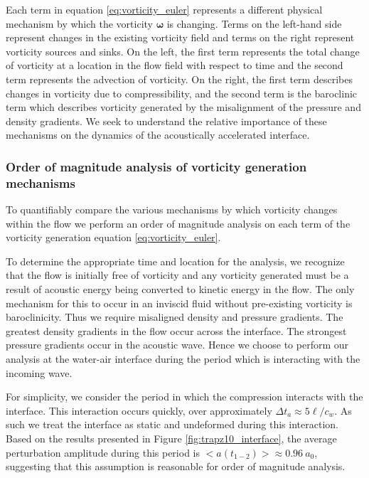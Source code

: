 Each term in equation \eqref{eq:vorticity_euler} represents a
different physical mechanism by which the vorticity
$\boldsymbol{\omega}$ is changing. Terms on the left-hand side
represent changes in the existing vorticity field and terms on the
right represent vorticity sources and sinks. On the left, the first
term represents the total change of vorticity at a location in the
flow field with respect to time and the second term represents the
advection of vorticity. On the right, the first term describes changes
in vorticity due to compressibility, and the second term is the
baroclinic term which describes vorticity generated by the
misalignment of the pressure and density gradients. We
seek to understand the relative importance of these mechanisms on the
dynamics of the acoustically accelerated interface.
% 
% 
\subsubsection{Order of magnitude analysis of vorticity generation mechanisms}
\label{subsubsec:oom_analysis}
To quantifiably compare the various mechanisms by which vorticity
changes within the flow we perform an order of magnitude analysis on
each term of the vorticity generation equation
\eqref{eq:vorticity_euler}.

To determine the appropriate time and location for the analysis, we
recognize that the flow is initially free of vorticity and any
vorticity generated must be a result of acoustic energy being
converted to kinetic energy in the flow. The only mechanism for
this to occur in an inviscid fluid without pre-existing vorticity is
baroclinicity. Thus we require misaligned density and pressure
gradients. The greatest density gradients in the flow occur across the
interface. The strongest pressure gradients occur in the acoustic
wave. Hence we choose to perform our analysis at the water-air
interface during the period which is interacting with the incoming
wave.

For simplicity, we consider the period in which the compression
interacts with the interface. This interaction occurs
quickly, over approximately $\Delta t_a\approx5\ell/c_{w}$. As such
we treat the interface as static and undeformed during this
interaction. Based on the results presented in Figure
\ref{fig:trapz10_interface}, the average perturbation amplitude during
this period is $<a(t_{1-2})>\approx0.96\ a_0$, suggesting that this
assumption is reasonable for order of magnitude analysis.

